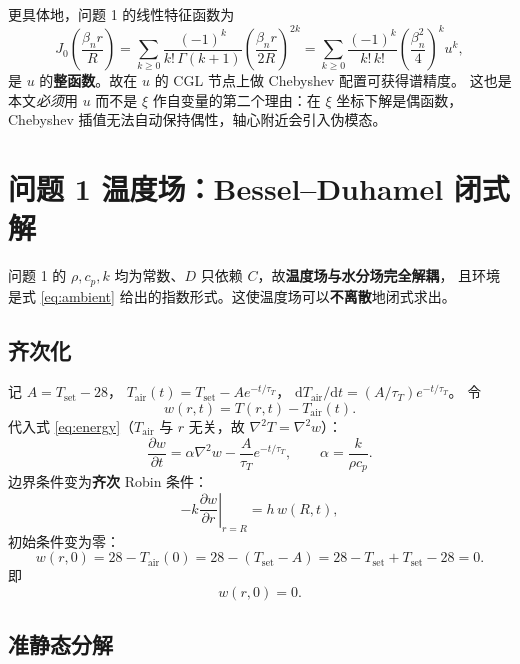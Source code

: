 \documentclass[11pt,a4paper]{article}
\theoremstyle{definition}
\begin{document}
更具体地，问题 1 的线性特征函数为
\[
J_0\!\left(\frac{\beta_n r}{R}\right)
=\sum_{k\ge0}\frac{(-1)^k}{k!\,\Gamma(k+1)}\left(\frac{\beta_n r}{2R}\right)^{2k}
=\sum_{k\ge0}\frac{(-1)^k}{k!\,k!}\left(\frac{\beta_n^2}{4}\right)^{k}u^{k},
\]
是 $u$ 的\textbf{整函数}。故在 $u$ 的 CGL 节点上做 Chebyshev 配置可获得谱精度。
这也是本文\emph{必须}用 $u$ 而不是 $\xi$ 作自变量的第二个理由：在 $\xi$ 坐标下解是偶函数，
Chebyshev 插值无法自动保持偶性，轴心附近会引入伪模态。

\section{问题 1 温度场：Bessel--Duhamel 闭式解}
\label{sec:bessel}

问题 1 的 $\rho,c_p,k$ 均为常数、$D$ 只依赖 $C$，故\textbf{温度场与水分场完全解耦}，
且环境是式 \eqref{eq:ambient} 给出的指数形式。这使温度场可以\textbf{不离散}地闭式求出。

\subsection{齐次化}

记 $A=T_{\mathrm{set}}-28$，
$T_{\mathrm{air}}(t)=T_{\mathrm{set}}-Ae^{-t/\tau_T}$，
$\mathrm{d}T_{\mathrm{air}}/\mathrm{d}t=(A/\tau_T)e^{-t/\tau_T}$。
令
\[
w(r,t)=T(r,t)-T_{\mathrm{air}}(t).
\]
代入式 \eqref{eq:energy}（$T_{\mathrm{air}}$ 与 $r$ 无关，故 $\nabla^2T=\nabla^2w$）：
\begin{equation}
\frac{\partial w}{\partial t}=\alpha\nabla^2w-\frac{A}{\tau_T}e^{-t/\tau_T},
\qquad \alpha=\frac{k}{\rho c_p}.
\label{eq:w_pde}
\end{equation}
边界条件变为\textbf{齐次} Robin 条件：
\begin{equation}
-k\left.\frac{\partial w}{\partial r}\right|_{r=R}=h\,w(R,t),
\label{eq:w_bc}
\end{equation}
初始条件变为零：
\[
w(r,0)=28-T_{\mathrm{air}}(0)=28-(T_{\mathrm{set}}-A)=28-T_{\mathrm{set}}+T_{\mathrm{set}}-28=0 .
\]
即
\begin{equation}
w(r,0)=0 .
\label{eq:w_ic}
\end{equation}

\subsection{准静态分解}
\end{document}
